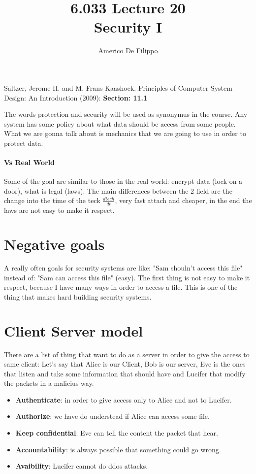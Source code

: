 \documentclass{article}
\title{6.033 Lecture 20 \\ Security I}
\author{Americo De Filippo}
\begin{document}
 
  \maketitle
  \begin{thebibliography}{9}
    Saltzer, Jerome H. and M. Frans Kaashoek. Principles of Computer System Design: An Introduction (2009): \textbf{Section: 11.1} 
  \end{thebibliography}
  \maketitle
  The words protection and security will be used as synonymus in the course.
  Any system has some policy about what data should be access from some people.
  What we are gonna talk about is mechanics that we are going to use in order to 
  protect data.
  \paragraph{Vs Real World}
    Some of the goal are similar to those in the real world: encrypt data (lock on a door), 
    what is legal (laws). The main differences between the 2 field are the change into the 
    time of the teck $\frac{dtech}{dt}$, very fast attach and cheaper, in the end the laws
    are not easy to make it respect.
  \section{Negative goals}
    A really often goals for security systems are like: "Sam shouln't access this file" instead
    of: "Sam can access this file" (easy). The first thing is not easy to make it respect, 
    because I have many ways in order to access a file. This is one of the thing that makes
    hard building security systems. 
  \section{Client Server model}
    There are a list of thing that want to do as a server in order to give the access to same 
    client: Let's say that Alice is our Client, Bob is our server, Eve is the ones that listen
    and take some information that should have and Lucifer that modify the packets in a malicius
    way.
    \begin{itemize}
      \item\textbf{Authenticate}: in order to give access only to Alice and not to Lucifer.
      \item\textbf{Authorize}: we have do understead if Alice can access some file.
      \item\textbf{Keep confidential}: Eve can tell the content the packet that hear.
      \item\textbf{Accountability}: is always possible that something could go wrong.
      \item\textbf{Avaibility}: Lucifer cannot do ddos attacks.
    \end{itemize}
\end{document}
